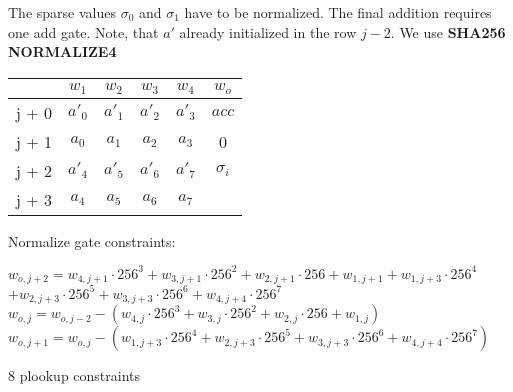 The sparse values $\sigma_0$ and $\sigma_1$ have to be normalized.
The final addition requires one add gate.
Note, that $a'$ already initialized in the row $j - 2$.
We use \textbf{SHA256 NORMALIZE4}
\begin{center}
    \begin{tabular}{ c|c|c|c|c|c }
        & $w_1$  & $w_2$  & $w_3$  & $w_4$  & $w_o$      \\
        \hline
        j + 0 & $a'_0$ & $a'_1$ & $a'_2$ & $a'_3$ & $acc$      \\
        j + 1 & $a_0$  & $ a_1$ & $a_2$  & $a_3$  & 0          \\
        j + 2 & $a'_4$ & $a'_5$ & $a'_6$ & $a'_7$ & $\sigma_i$ \\
        j + 3 & $a_4$  & $ a_5$ & $a_6$  & $a_7$  &            \\
    \end{tabular}
\end{center}

Normalize gate constraints:
\begin{center}
    $w_{o,j+2} = w_{4,j+1} \cdot 256^3 + w_{3,j+1} \cdot 256^2 + w_{2,j+1} \cdot 256 + w_{1,j+1}
    + w_{1,j+3} \cdot 256^4$ \\
    $+ w_{2,j+3} \cdot 256^5+ w_{3,j+3} \cdot 256^6 + w_{4,j+4} \cdot 256^7$ \\
    $w_{o,j} = w_{o, j - 2} - (w_{4,j} \cdot 256^3 + w_{3,j} \cdot 256^2 + w_{2,j} \cdot 256 + w_{1,j})$ \\
    $w_{o,j+1} = w_{o,j} - ( w_{1,j+3} \cdot 256^4 + w_{2,j+3} \cdot 256^5+ w_{3,j+3} \cdot 256^6 + w_{4,j+4} \cdot 256^7)$

    8 plookup constraints \\
\end{center}

